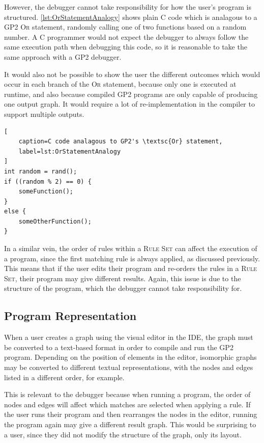 \documentclass[authoryearcitations]{UoYCSproject}
\begin{document}
However, the debugger cannot take responsibility for how the user's program
is structured. \autoref{lst:OrStatementAnalogy} shows plain C code which is
analagous to a GP2 \textsc{Or} statement, randomly calling one of two
functions based on a random number. A C programmer would not expect the
debugger to always follow the same execution path when debugging this code,
so it is reasonable to take the same approach with a GP2 debugger.

It would also not be possible to show the user the different outcomes which
would occur in each branch of the \textsc{Or} statement, because only one is
executed at runtime, and also because compiled GP2 programs are only capable
of producing one output graph. It would require a lot of re-implementation in
the compiler to support multiple outputs.

\begin{lstlisting}[
    caption=C code analagous to GP2's \textsc{Or} statement,
    label=lst:OrStatementAnalogy
]
int random = rand();
if ((random % 2) == 0) {
    someFunction();
}
else {
    someOtherFunction();
}
\end{lstlisting}

In a similar vein, the order of rules within a \textsc{Rule Set} can affect the
execution of a program, since the first matching rule is always applied, as
discussed previously. This means that if the user edits their program and
re-orders the rules in a \textsc{Rule Set}, their program may give different
results. Again, this issue is due to the structure of the program, which the
debugger cannot take responsibility for.


\subsection{Program Representation}
\label{sec:ProgramRepresentation}

When a user creates a graph using the visual editor in the IDE, the graph must
be converted to a text-based format in order to compile and run the GP2 program.
Depending on the position of elements in the editor, isomorphic graphs may be
converted to different textual representations, with the nodes and edges listed
in a different order, for example.

This is relevant to the debugger because when running a program, the order of
nodes and edges will affect which matches are selected when applying a rule. If
the user runs their program and then rearranges the nodes in the editor, running
the program again may give a different result graph. This would be surprising to
a user, since they did not modify the structure of the graph, only its layout.
\end{document}

